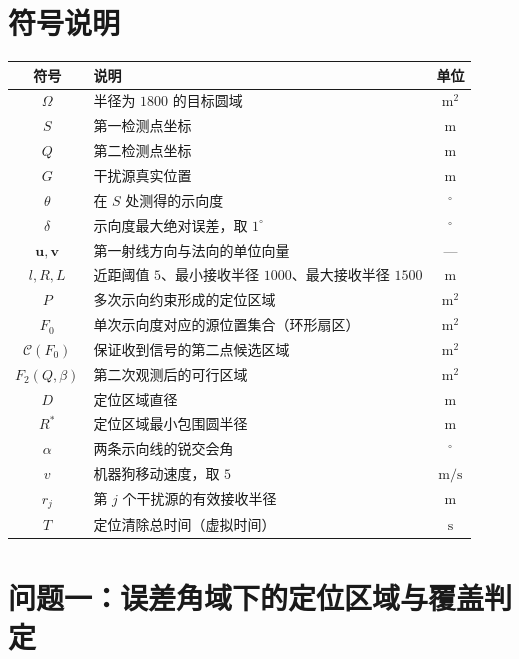 \documentclass[12pt,a4paper]{ctexart}
\begin{document}
\section{符号说明}
\begin{table}[H]
  \centering
  \begin{tabularx}{\textwidth}{cXc}
    \toprule
    符号 & 说明 & 单位 \\
    \midrule
    $\Omega$ & 半径为 $1800$ 的目标圆域 & $\mathrm{m}^2$ \\
    $S$ & 第一检测点坐标 & $\mathrm{m}$ \\
    $Q$ & 第二检测点坐标 & $\mathrm{m}$ \\
    $G$ & 干扰源真实位置 & $\mathrm{m}$ \\
    $\theta$ & 在 $S$ 处测得的示向度 & $^\circ$ \\
    $\delta$ & 示向度最大绝对误差，取 $1^\circ$ & $^\circ$ \\
    $\bm u,\bm v$ & 第一射线方向与法向的单位向量 & — \\
    $l,R,L$ & 近距阈值 $5$、最小接收半径 $1000$、最大接收半径 $1500$ & $\mathrm{m}$ \\
    $P$ & 多次示向约束形成的定位区域 & $\mathrm{m}^2$ \\
    $F_0$ & 单次示向度对应的源位置集合（环形扇区） & $\mathrm{m}^2$ \\
    $\mathcal C(F_0)$ & 保证收到信号的第二点候选区域 & $\mathrm{m}^2$ \\
    $F_2(Q,\beta)$ & 第二次观测后的可行区域 & $\mathrm{m}^2$ \\
    $D$ & 定位区域直径 & $\mathrm{m}$ \\
    $R^*$ & 定位区域最小包围圆半径 & $\mathrm{m}$ \\
    $\alpha$ & 两条示向线的锐交会角 & $^\circ$ \\
    $v$ & 机器狗移动速度，取 $5$ & $\mathrm{m/s}$ \\
    $r_j$ & 第 $j$ 个干扰源的有效接收半径 & $\mathrm{m}$ \\
    $T$ & 定位清除总时间（虚拟时间） & $\mathrm{s}$ \\
    \bottomrule
  \end{tabularx}
  \label{tab:symbols}
\end{table}

\section{问题一：误差角域下的定位区域与覆盖判定}
\end{document}
